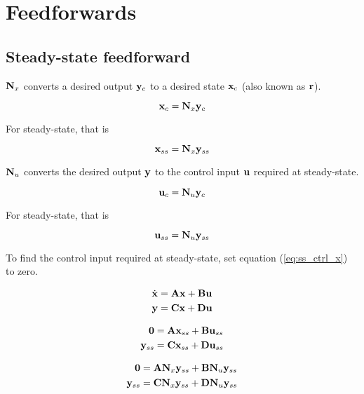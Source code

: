 \section{Feedforwards}

\subsection{Steady-state feedforward}

$\mathbf{N}_x$ converts a desired output $\mathbf{y}_c$ to a desired state
$\mathbf{x}_c$ (also known as $\mathbf{r}$).

\begin{equation*}
  \mathbf{x}_c = \mathbf{N}_x\mathbf{y}_c
\end{equation*}

For steady-state, that is

\begin{equation*}
  \mathbf{x}_{ss} = \mathbf{N}_x\mathbf{y}_{ss}
\end{equation*}

$\mathbf{N}_u$ converts the desired output $\mathbf{y}$ to the control input
$\mathbf{u}$ required at steady-state.

\begin{equation*}
  \mathbf{u}_c = \mathbf{N}_u\mathbf{y}_c
\end{equation*}

For steady-state, that is

\begin{equation*}
  \mathbf{u}_{ss} = \mathbf{N}_u\mathbf{y}_{ss}
\end{equation*}

To find the control input required at steady-state, set equation
(\ref{eq:ss_ctrl_x}) to zero.

\begin{align*}
  \dot{\mathbf{x}} &= \mathbf{A}\mathbf{x} + \mathbf{B}\mathbf{u} \\
  \mathbf{y} &= \mathbf{C}\mathbf{x} + \mathbf{D}\mathbf{u}
\end{align*}

\begin{align*}
  \mathbf{0} &= \mathbf{A}\mathbf{x}_{ss} + \mathbf{B}\mathbf{u}_{ss} \\
  \mathbf{y}_{ss} &= \mathbf{C}\mathbf{x}_{ss} + \mathbf{D}\mathbf{u}_{ss}
\end{align*}

\begin{align*}
  \mathbf{0} &= \mathbf{A}\mathbf{N}_x\mathbf{y}_{ss} + \mathbf{B}\mathbf{N}_u\mathbf{y}_{ss} \\
  \mathbf{y}_{ss} &= \mathbf{C}\mathbf{N}_x\mathbf{y}_{ss} + \mathbf{D}\mathbf{N}_u\mathbf{y}_{ss}
\end{align*}

